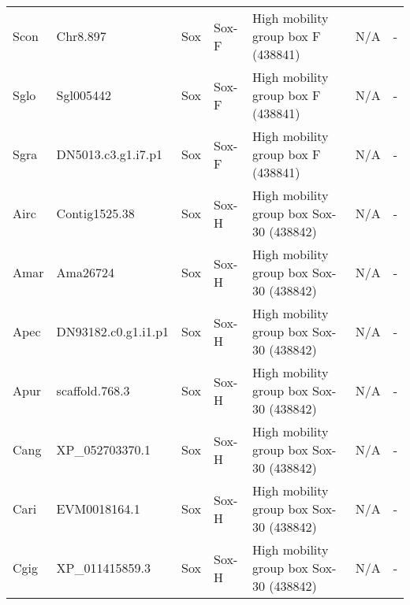 \documentclass[../main.tex]{subfiles}
\begin{document}
\begin{landscape}
\begin{longtable}{lllllll}
		Scon           & Chr8.897              & Sox            & Sox-F               & High mobility group box F (438841)          & N/A                                                                    & -                    \\
		Sglo           & Sgl005442             & Sox            & Sox-F               & High mobility group box F (438841)          & N/A                                                                    & -                    \\
		Sgra           & DN5013.c3.g1.i7.p1    & Sox            & Sox-F               & High mobility group box F (438841)          & N/A                                                                    & -                    \\
		Airc           & Contig1525.38         & Sox            & Sox-H               & High mobility group box Sox-30 (438842)     & N/A                                                                    & -                    \\
		Amar           & Ama26724              & Sox            & Sox-H               & High mobility group box Sox-30 (438842)     & N/A                                                                    & -                    \\
		Apec           & DN93182.c0.g1.i1.p1   & Sox            & Sox-H               & High mobility group box Sox-30 (438842)     & N/A                                                                    & -                    \\
		Apur           & scaffold.768.3        & Sox            & Sox-H               & High mobility group box Sox-30 (438842)     & N/A                                                                    & -                    \\
		Cang           & XP\_052703370.1       & Sox            & Sox-H               & High mobility group box Sox-30 (438842)     & N/A                                                                    & -                    \\
		Cari           & EVM0018164.1          & Sox            & Sox-H               & High mobility group box Sox-30 (438842)     & N/A                                                                    & -                    \\
		Cgig           & XP\_011415859.3       & Sox            & Sox-H               & High mobility group box Sox-30 (438842)     & N/A                                                                    & -                    \\

\end{longtable}
\end{landscape}
\end{document}
